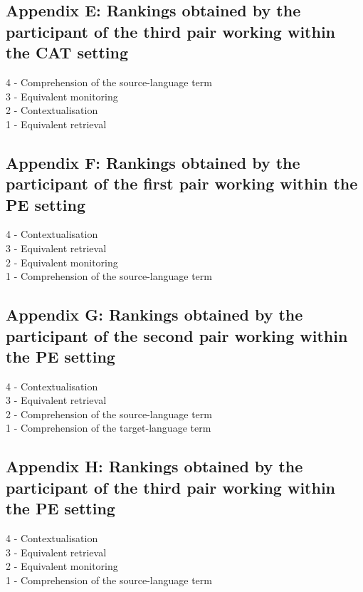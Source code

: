 \documentclass[output=paper]{LSP/langsci}
\begin{document}
\subsection*{Appendix E: Rankings obtained by the participant of the third pair working within the CAT setting}

4 - Comprehension of the source-language term \\
3 - Equivalent monitoring \\
2 - Contextualisation \\
1 - Equivalent retrieval

\subsection*{Appendix F: Rankings obtained by the participant of the first pair working within the PE setting}

4 - Contextualisation \\
3 - Equivalent retrieval \\
2 - Equivalent monitoring \\
1 - Comprehension of the source-language term

\subsection*{Appendix G: Rankings obtained by the participant of the second pair working within the PE setting}

4 - Contextualisation \\
3 - Equivalent retrieval \\
2 - Comprehension of the source-language term \\
1 - Comprehension of the target-language term

\subsection*{Appendix H: Rankings obtained by the participant of the third pair working within the PE setting}

4 - Contextualisation \\
3 - Equivalent retrieval \\
2 - Equivalent monitoring \\
1 - Comprehension of the source-language term

\newpage 
\sloppy
\printbibliography[heading=subbibliography,notkeyword=this]
\end{document}
